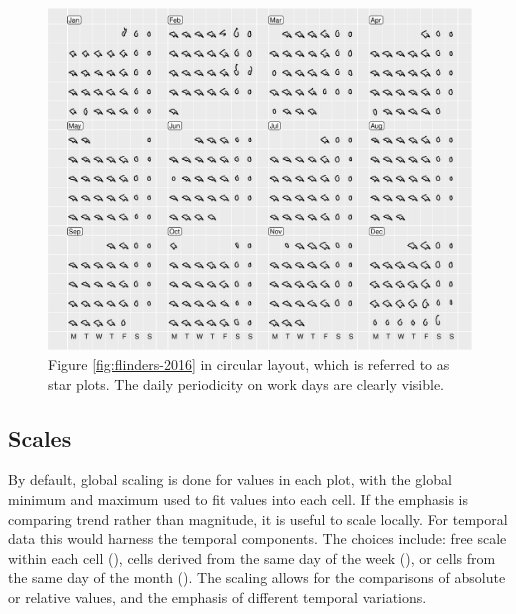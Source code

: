 \documentclass[article]{jss}
\theoremstyle{definition}
\theoremstyle{definition}
\theoremstyle{definition}
\theoremstyle{remark}
\begin{document}
\begin{CodeChunk}
\begin{figure}

{\centering \includegraphics[width=\textwidth]{figure/flinders-polar-1} 

}

\caption[Figure \ref{fig:flinders-2016} in circular
layout, which is referred to as star plots. The daily periodicity on
work days are clearly visible.]{Figure \ref{fig:flinders-2016} in circular
layout, which is referred to as star plots. The daily periodicity on
work days are clearly visible.}\label{fig:flinders-polar}
\end{figure}
\end{CodeChunk}





\subsection{Scales}\label{scales}

By default, global scaling is done for values in each plot, with the
global minimum and maximum used to fit values into each cell. If the
emphasis is comparing trend rather than magnitude, it is useful to scale
locally. For temporal data this would harness the temporal components.
The choices include: free scale within each cell (), cells
derived from the same day of the week (), or cells from
the same day of the month (). The scaling allows for the
comparisons of absolute or relative values, and the emphasis of
different temporal variations.
\end{document}
